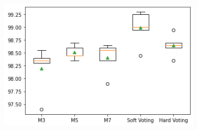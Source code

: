 \documentclass{article}
\begin{document}
\begin{figure}[!htb]
  \includegraphics[width=\linewidth]{figure/cnn_test_1.png}


\end{figure}
\end{document}
